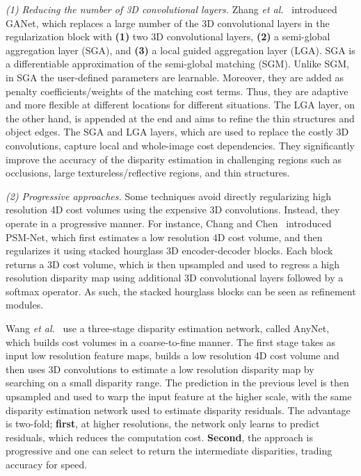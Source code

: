 \documentclass[10pt,journal,compsoc]{IEEEtran}
\newcommand{\etal}{\emph{et al.}}
\newcommand{\noi}{\noindent}
\begin{document}
\vspace{6pt}
\noi\textit{(1) Reducing the number of 3D convolutional layers. } Zhang \etal~\cite{zhang2019ga} introduced GANet, which replaces a large number of the 3D convolutional layers in the regularization block with \textbf{(1)} two 3D convolutional layers, \textbf{(2)} a semi-global aggregation layer  (SGA), and \textbf{(3)} a  local guided aggregation layer (LGA). SGA is a differentiable approximation of the semi-global matching (SGM). Unlike SGM, in SGA the user-defined parameters are learnable. Moreover, they are added as penalty coefficients/weights of the matching cost terms.  Thus, they are  adaptive and more flexible at different locations for different situations. The LGA layer, on the other hand, is appended at the end and  aims to refine the thin structures and object edges. The SGA and LGA layers, which are used to replace the  costly 3D convolutions,  capture local and  whole-image cost dependencies. They significantly improve the accuracy of the disparity estimation in challenging regions such as occlusions, large textureless/reflective regions, and thin structures. 

\vspace{6pt}
\noi\textit{(2) Progressive approaches. } Some techniques avoid  directly regularizing  high resolution 4D cost volumes using the expensive 3D convolutions. Instead, they operate in a progressive manner. For instance, Chang and Chen~\cite{chang2018pyramid} introduced PSM-Net, which first estimates a low resolution 4D cost volume, and  then regularizes it using stacked hourglass 3D encoder-decoder blocks. Each block returns a 3D cost volume, which is then upsampled and used to regress a high resolution disparity map using additional 3D convolutional layers followed by  a softmax operator. As such, the stacked hourglass blocks can be seen as refinement modules. 

Wang \etal~\cite{wang2019anytime} use a three-stage disparity estimation network, called AnyNet, which builds cost volumes in a coarse-to-fine manner.  The first stage takes as input low resolution feature maps, builds a low resolution 4D cost volume and then uses 3D convolutions to estimate a low resolution disparity map by searching on a small disparity range.  The prediction in the previous level is then upsampled and used to warp the input feature at the higher scale, with the same disparity estimation network used to estimate disparity residuals. The advantage  is two-fold; \textbf{first}, at higher resolutions, the network only learns to predict residuals, which reduces the computation cost. \textbf{Second}, the approach is progressive and one can select to return the intermediate disparities, trading  accuracy for speed. 
\end{document}
